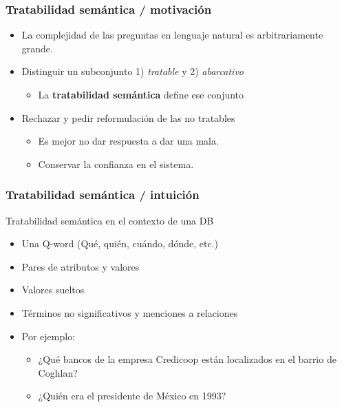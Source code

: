 \begin{frame}[<+->]
  \frametitle{Tratabilidad semántica / motivación}
      \begin{itemize}
          \item La complejidad de las preguntas en lenguaje natural es arbitrariamente grande.
          \item Distinguir un subconjunto 1) \textit{tratable} y 2) \textit{abarcativo}
          \begin{itemize}
            \item La {\color{blue}\textbf{tratabilidad semántica}} define ese conjunto
          \end{itemize}
          \item Rechazar y pedir reformulación de las no tratables
          \begin{itemize}
            \item Es mejor no dar respuesta a dar una mala. 
            \item Conservar la confianza en el sistema.
          \end{itemize}
      \end{itemize}
\end{frame}

\begin{frame}[<+->]
  \frametitle{Tratabilidad semántica / intuición}
    \begin{block}{Tratabilidad semántica en el contexto de una DB}
      \begin{itemize}
          \item Una {\color{green}Q-word} (Qué, quién, cuándo, dónde, etc.)
          \item Pares de {\color{blue}atributos} y {\color{blue}valores}
          \item {\color{purple}Valores} sueltos
          \item Términos no significativos y {\color{orange}menciones a relaciones}
          \item Por ejemplo:
            \begin{itemize}
              \item ¿{\color{green}Qué} {\color{orange}bancos} de la {\color{red}empresa Credicoop} están localizados en el {\color{blue}barrio} de {\color{blue}Coghlan}?
              \item ¿{\color{green}Quién} era el {\color{red}presidente} de {\color{red}México} en {\color{purple}1993}?
            \end{itemize}
      \end{itemize}
    \end{block}
\end{frame}

